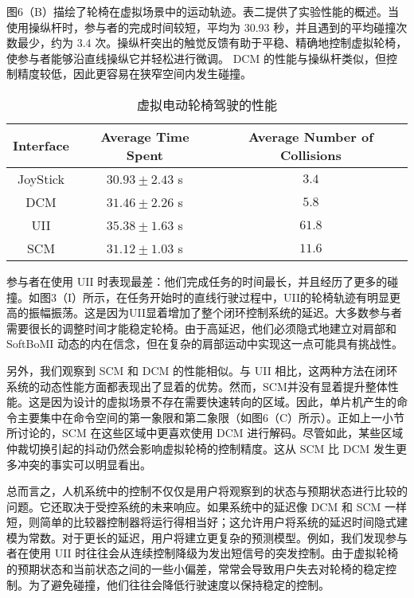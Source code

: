 图6（B）描绘了轮椅在虚拟场景中的运动轨迹。表二提供了实验性能的概述。当使用操纵杆时，参与者的完成时间较短，平均为 30.93 秒，并且遇到的平均碰撞次数最少，约为 3.4 次。操纵杆突出的触觉反馈有助于平稳、精确地控制虚拟轮椅，使参与者能够沿直线操纵它并轻松进行微调。 DCM 的性能与操纵杆类似，但控制精度较低，因此更容易在狭窄空间内发生碰撞。  

\begin{table}
 \centering
 \caption{虚拟电动轮椅驾驶的性能  }
 \setlength{\tabcolsep}{5pt}
 \begin{tabular}{c c c}
 \hline\hline
  Interface & Average Time Spent & Average Number of Collisions  \\  
 \hline
 JoyStick&        $30.93\pm 2.43$        s&        $3.4$         \\ 
 DCM&        $31.46\pm 2.26$        s&        $5.8$         \\ 
 UII&        $35.38\pm 1.63$        s&        $61.8$         \\ 
 SCM&        $31.12\pm 1.03$        s&        $11.6$         \\  
 \hline\hline
 \end{tabular}
 \label{tab2}
\end{table}     

参与者在使用 UII 时表现最差：他们完成任务的时间最长，并且经历了更多的碰撞。如图3（I）所示，在任务开始时的直线行驶过程中，UII的轮椅轨迹有明显更高的振幅振荡。这是因为UII显着增加了整个闭环控制系统的延迟。大多数参与者需要很长的调整时间才能稳定轮椅。由于高延迟，他们必须隐式地建立对肩部和 SoftBoMI 动态的内在信念，但在复杂的肩部运动中实现这一点可能具有挑战性。  

另外，我们观察到 SCM 和 DCM 的性能相似。与 UII 相比，这两种方法在闭环系统的动态性能方面都表现出了显着的优势。然而，SCM并没有显着提升整体性能。这是因为设计的虚拟场景不存在需要快速转向的区域。因此，单片机产生的命令主要集中在命令空间的第一象限和第二象限（如图6（C）所示）。正如上一小节所讨论的，SCM 在这些区域中更喜欢使用 DCM 进行解码。尽管如此，某些区域仲裁切换引起的抖动仍然会影响虚拟轮椅的控制精度。这从 SCM 比 DCM 发生更多冲突的事实可以明显看出。  

总而言之，人机系统中的控制不仅仅是用户将观察到的状态与预期状态进行比较的问题。它还取决于受控系统的未来响应。如果系统中的延迟像 DCM 和 SCM 一样短，则简单的比较器控制器将运行得相当好；这允许用户将系统的延迟时间隐式建模为常数。对于更长的延迟，用户将建立更复杂的预测模型。例如，我们发现参与者在使用 UII 时往往会从连续控制降级为发出短信号的突发控制。由于虚拟轮椅的预期状态和当前状态之间的一些小偏差，常常会导致用户失去对轮椅的稳定控制。为了避免碰撞，他们往往会降低行驶速度以保持稳定的控制。  

